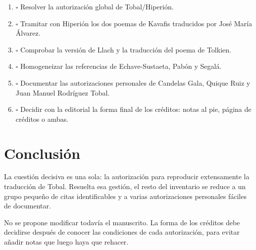 \documentclass[12pt,a4paper]{article}
\begin{document}
\begin{enumerate}[leftmargin=*]
  \item $\square$ Resolver la autorización global de Tobal/Hiperión.
  \item $\square$ Tramitar con Hiperión los dos poemas de Kavafis traducidos por José María Álvarez.
  \item $\square$ Comprobar la versión de Llach y la traducción del poema de Tolkien.
  \item $\square$ Homogeneizar las referencias de Echave-Sustaeta, Pabón y Segalá.
  \item $\square$ Documentar las autorizaciones personales de Candelas Gala, Quique Ruiz y Juan Manuel Rodríguez Tobal.
  \item $\square$ Decidir con la editorial la forma final de los créditos: notas al pie, página de créditos o ambas.
\end{enumerate}

\section*{Conclusión}

La cuestión decisiva es una sola: la autorización para reproducir extensamente la traducción de Tobal. Resuelta esa gestión, el resto del inventario se reduce a un grupo pequeño de citas identificables y a varias autorizaciones personales fáciles de documentar.

No se propone modificar todavía el manuscrito. La forma de los créditos debe decidirse después de conocer las condiciones de cada autorización, para evitar añadir notas que luego haya que rehacer.
\end{document}

